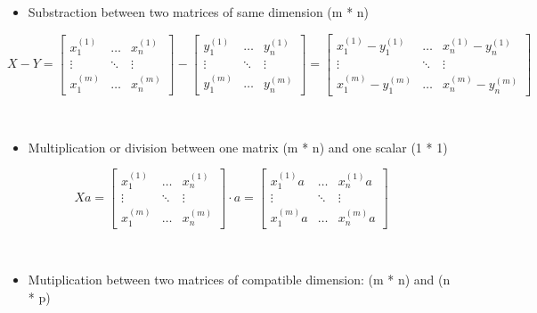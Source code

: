 \documentclass[]{article}
\providecommand{\tightlist}{%
  \setlength{\itemsep}{0pt}\setlength{\parskip}{0pt}}
\begin{document}
\begin{itemize}
\tightlist
\item
  Substraction between two matrices of same dimension (m * n)
\end{itemize}

\large

\[
X - Y = 
\begin{bmatrix} 
x_{1}^{(1)} & \dots & x_{n}^{(1)}  \\ 
\vdots & \ddots & \vdots \\ 
x_{1}^{(m)} & \dots & x_{n}^{(m)} 
\end{bmatrix} - 
\begin{bmatrix} 
y_{1}^{(1)} & \dots & y_{n}^{(1)}  \\ 
\vdots & \ddots & \vdots \\ 
y_{1}^{(m)} & \dots & y_{n}^{(m)} 
\end{bmatrix} = 
\begin{bmatrix} 
x_{1}^{(1)} - y_{1}^{(1)}  & \dots & x_{n}^{(1)} - y_{n}^{(1)}  \\ 
\vdots & \ddots & \vdots \\ 
x_{1}^{(m)} - y_{1}^{(m)} & \dots & x_{n}^{(m)} - y_{n}^{(m)}
\end{bmatrix}
\] \normalsize

​

\begin{itemize}
\tightlist
\item
  Multiplication or division between one matrix (m * n) and one scalar
  (1 * 1)
\end{itemize}

\large

\[
Xa = 
\begin{bmatrix} 
x_{1}^{(1)} & \dots & x_{n}^{(1)}  \\ 
\vdots & \ddots & \vdots \\ 
x_{1}^{(m)} & \dots & x_{n}^{(m)} 
\end{bmatrix} 
\cdot a
= 
\begin{bmatrix} 
x_{1}^{(1)} a  & \dots & x_{n}^{(1)} a  \\ 
\vdots & \ddots & \vdots \\ 
x_{1}^{(m)} a & \dots & x_{n}^{(m)} a
\end{bmatrix}
\] \normalsize

​

\begin{itemize}
\tightlist
\item
  Mutiplication between two matrices of compatible dimension: (m * n)
  and (n * p)
\end{itemize}
\end{document}
